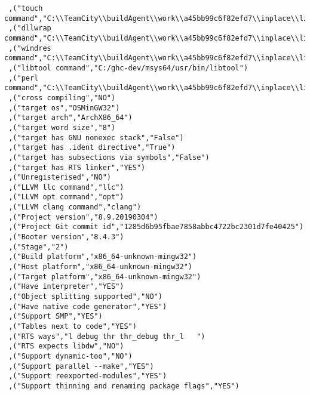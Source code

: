 \begin{verbatim}
 ,("touch command","C:\\TeamCity\\buildAgent\\work\\a45bb99c6f82efd7\\inplace\\lib/bin/touchy.exe")
 ,("dllwrap command","C:\\TeamCity\\buildAgent\\work\\a45bb99c6f82efd7\\inplace\\lib\\../mingw/bin/dllwrap.exe")
 ,("windres command","C:\\TeamCity\\buildAgent\\work\\a45bb99c6f82efd7\\inplace\\lib\\../mingw/bin/windres.exe")
 ,("libtool command","C:/ghc-dev/msys64/usr/bin/libtool")
 ,("perl command","C:\\TeamCity\\buildAgent\\work\\a45bb99c6f82efd7\\inplace\\lib\\../perl/perl.exe")
 ,("cross compiling","NO")
 ,("target os","OSMinGW32")
 ,("target arch","ArchX86_64")
 ,("target word size","8")
 ,("target has GNU nonexec stack","False")
 ,("target has .ident directive","True")
 ,("target has subsections via symbols","False")
 ,("target has RTS linker","YES")
 ,("Unregisterised","NO")
 ,("LLVM llc command","llc")
 ,("LLVM opt command","opt")
 ,("LLVM clang command","clang")
 ,("Project version","8.9.20190304")
 ,("Project Git commit id","1285d6b95fbae7858abbc4722bc2301d7fe40425")
 ,("Booter version","8.4.3")
 ,("Stage","2")
 ,("Build platform","x86_64-unknown-mingw32")
 ,("Host platform","x86_64-unknown-mingw32")
 ,("Target platform","x86_64-unknown-mingw32")
 ,("Have interpreter","YES")
 ,("Object splitting supported","NO")
 ,("Have native code generator","YES")
 ,("Support SMP","YES")
 ,("Tables next to code","YES")
 ,("RTS ways","l debug thr thr_debug thr_l   ")
 ,("RTS expects libdw","NO")
 ,("Support dynamic-too","NO")
 ,("Support parallel --make","YES")
 ,("Support reexported-modules","YES")
 ,("Support thinning and renaming package flags","YES")

\end{verbatim}
